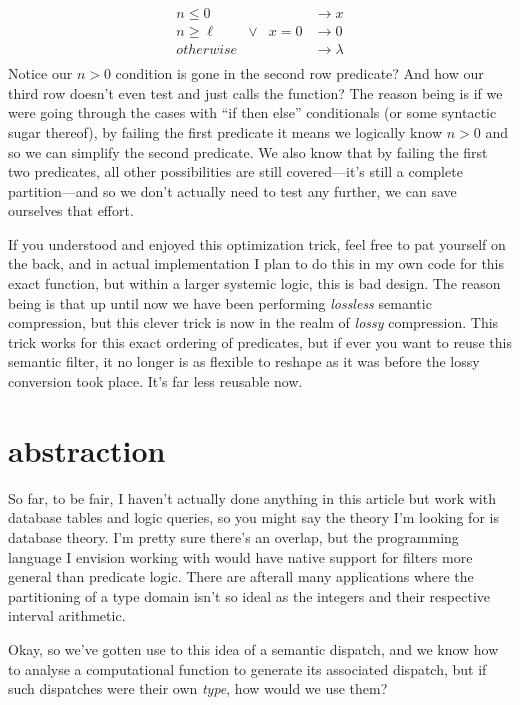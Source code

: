 \documentclass[twoside]{article}
\begin{document}
$$ \begin{array}{rcl|l}
n \le 0		& 	&	& \to x		\\
n \ge \ell	& \vee	& x = 0	& \to 0		\\
otherwise	& 	& 	& \to \lambda	\\
\end{array} $$
Notice our $ n > 0 $ condition is gone in the second row predicate? And how our third row doesn't even test
and just calls the function? The reason being is if we were going through the cases with ``if then else''
conditionals (or some syntactic sugar thereof), by failing the first predicate it means we logically know
$ n > 0 $ and so we can simplify the second predicate. We also know that by failing the first two predicates,
all other possibilities are still covered---it's still a complete partition---and so we don't actually need
to test any further, we can save ourselves that effort.

If you understood and enjoyed this optimization trick, feel free to pat yourself on the back, and in actual
implementation I plan to do this in my own code for this exact function, but within a larger systemic logic,
this is bad design. The reason being is that up until now we have been performing \emph{lossless} semantic
compression, but this clever trick is now in the realm of \emph{lossy} compression. This trick works for
this exact ordering of predicates, but if ever you want to reuse this semantic filter, it no longer is
as flexible to reshape as it was before the lossy conversion took place. It's far less reusable now.

\section*{abstraction}

So far, to be fair, I haven't actually done anything in this article but work with database tables
and logic queries, so you might say the theory I'm looking for is database theory. I'm pretty sure
there's an overlap, but the programming language I envision working with would have native support for
filters more general than predicate logic. There are afterall many applications where the partitioning
of a type domain isn't so ideal as the integers and their respective interval arithmetic.

Okay, so we've gotten use to this idea of a semantic dispatch, and we know how to analyse a computational
function to generate its associated dispatch, but if such dispatches were their own \emph{type},
how would we use them?
\end{document}
